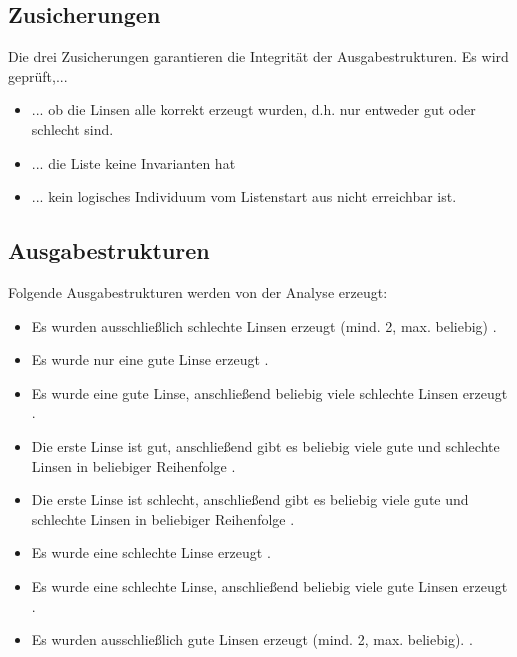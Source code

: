 

\subsection{Zusicherungen}
Die drei Zusicherungen garantieren die Integrität der Ausgabestrukturen. Es wird geprüft,...
\begin{itemize}
	\item ... ob die Linsen alle korrekt erzeugt wurden, d.h. nur entweder gut oder schlecht sind.
	\item ... die Liste keine Invarianten hat
	\item ... kein logisches Individuum vom Listenstart aus nicht erreichbar ist.
\end{itemize}


\subsection{Ausgabestrukturen}
Folgende Ausgabestrukturen werden von der Analyse erzeugt:

\begin{itemize}[$\rightarrow$]
	\item Es wurden ausschließlich schlechte Linsen erzeugt (mind. 2, max. beliebig) .
	\item Es wurde nur eine gute Linse erzeugt .
	\item Es wurde eine gute Linse, anschließend beliebig viele schlechte Linsen erzeugt .
	\item Die erste Linse ist gut, anschließend gibt es beliebig viele gute und schlechte Linsen in beliebiger Reihenfolge .
	\item Die erste Linse ist schlecht, anschließend gibt es beliebig viele gute und schlechte Linsen in beliebiger Reihenfolge .
	\item Es wurde eine schlechte Linse erzeugt .
	\item Es wurde eine schlechte Linse, anschließend beliebig viele gute Linsen erzeugt .
	\item Es wurden ausschließlich gute Linsen erzeugt (mind. 2, max. beliebig). .
\end{itemize}